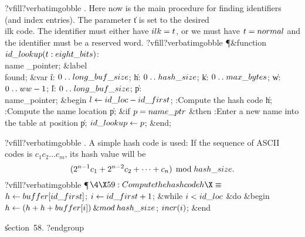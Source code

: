 \fi
?vfill?verbatimgobble
. Here now is the main procedure for finding identifiers (and index
entries).  The parameter \|t is set to the desired \\{ilk} code. The
identifier must either have $\\{ilk}=\|t$, or we must have
$\|t=\\{normal}$ and the identifier must be a reserved word.
?vfill?verbatimgobble
\Y\P\4\&{function}\1\  $\\{id\_lookup}(\|t:\\{eight\_bits})$: \\{name%
\_pointer};\6
\4\&{label} \\{found};\6
\4\&{var} \|i: $0\to\\{long\_buf\_size}$;\6
\|h: $0\to\\{hash\_size}$;\6
\|k: $0\to\\{max\_bytes}$;\6
\|w: $0\to\\{ww}-1$;\6
\|l: $0\to\\{long\_buf\_size}$;\6
\|p: \\{name\_pointer};\2\6
\&{begin} $\|l\K\\{id\_loc}-\\{id\_first}$;\6
:Compute the hash code \|h\X;\6
:Compute the name location \|p\X;\6
\&{if} $\|p=\\{name\_ptr}$ \1\&{then}\5
:Enter a new name into the table at position \|p\X;\2\6
$\\{id\_lookup}\K\|p$;\6
\&{end};\par
\fi
?vfill?verbatimgobble
. A simple hash code is used: If the sequence of
ASCII codes is $c_1c_2\ldots c_m$, its hash value will be
$$(2^{n-1}c_1+2^{n-2}c_2+\cdots+c_n)\,\bmod\,\\{hash\_size}.$$
?vfill?verbatimgobble
\Y\P$\4\X59:Compute the hash code \|h\X\S$\6
$\|h\K\\{buffer}[\\{id\_first}]$;\5
$\|i\K\\{id\_first}+1$;\6
\&{while} $\|i<\\{id\_loc}$ \1\&{do}\6
\&{begin} $\|h\K(\|h+\|h+\\{buffer}[\|i])\mathbin{\&{mod}}\\{hash\_size}$;\5
$\\{incr}(\|i)$;\6
\&{end}\2\par
\U section~58.\fi
?endgroup
\endgroup
\eject
\def\runninghead{APPENDIX C --- TRANSLATION BY {\tentt TANGLE}}
\def\bkminfo{Translation by TANGLE}
